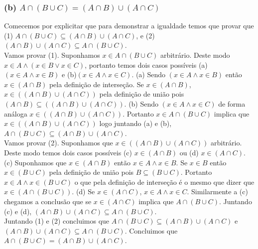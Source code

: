 \documentclass{article}
\begin{document}
\subsubsection*{(b) $A \cap (B \cup C) = (A \cap B) \cup (A \cap C)$}
Comecemos por explicitar que para demonstrar a igualdade temos que provar que (1) $A \cap (B \cup C) \subseteq (A \cap B) \cup (A \cap C)$, e (2) $(A \cap B) \cup (A \cap C) \subseteq A \cap (B \cup C)$.
\\[\baselineskip]
Vamos provar (1). Suponhamos $x \in A \cap (B \cup C)$ arbitrário. Deste modo $x \in A \wedge (x \in B \vee x \in C)$, portanto temos dois casos possíveis (a)
$(x \in A \wedge x \in B )$ e (b)$(x \in A \wedge x \in C)$. (a) Sendo $(x \in A \wedge x \in B )$ então $x \in (A \cap B)$ pela definição de interseção. Se $x \in (A \cap B)$, $x \in ((A \cap B) \cup (A \cap C))$ pela definição de união pois $(A \cap B) \subseteq ((A \cap B) \cup (A \cap C))$. (b) Sendo $(x \in A \wedge x \in C)$ de forma análoga $x \in ((A \cap B) \cup (A \cap C))$. Portanto $x \in A \cap (B \cup C)$ implica que $x \in ((A \cap B) \cup (A \cap C))$ logo juntando (a) e (b), $A \cap (B \cup C) \subseteq (A \cap B) \cup (A \cap C)$.
\\[\baselineskip]
Vamos provar (2). Suponhamos que $x \in ((A \cap B) \cup (A \cap C))$ arbitrário. Deste modo temos dois casos possíveis (c) $x \in (A \cap B)$ ou (d) $x \in (A \cap C)$. (c) Suponhamos que $x \in (A \cap B)$ então $x \in A \wedge x \in B$. Se $x \in B$ então $x \in (B \cup C)$ pela definição de união pois $B \subseteq (B \cup C)$. Portanto  $x \in A \wedge x \in (B \cup C)$ o que pela definição de interseção é o mesmo que dizer que $x \in (A \cap (B \cup C))$. (d) Se $x \in (A \cap C)$, $x \in A \wedge x \in C$. Similarmente a (c) chegamos a conclusão que se $x \in (A \cap C)$ implica que $A \cap (B \cup C)$. Juntando (c) e (d), $(A \cap B) \cup (A \cap C) \subseteq A \cap (B \cup C)$.
\\[\baselineskip]
Juntando (1) e (2) concluimos que $A \cap (B \cup C) \subseteq (A \cap B) \cup (A \cap C)$ e $(A \cap B) \cup (A \cap C) \subseteq A \cap (B \cup C)$. Concluimos que $A \cap (B \cup C) = (A \cap B) \cup (A \cap C)$.
\end{document}
